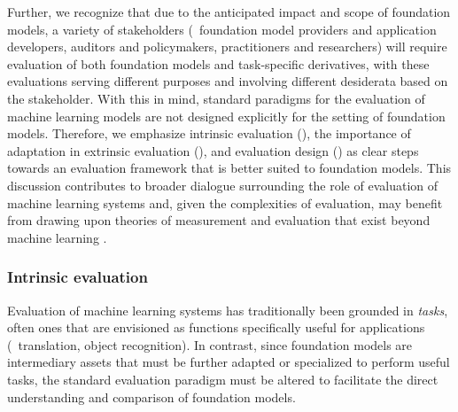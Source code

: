 Further, we recognize that due to the anticipated impact and scope of foundation models, a variety of stakeholders (\eg~foundation model providers and application developers, auditors and policymakers, practitioners and researchers) will require evaluation of both foundation models and task-specific derivatives, with these evaluations serving different purposes and involving different desiderata based on the stakeholder. 
With this in mind, standard paradigms for the evaluation of machine learning models are not designed explicitly for the setting of foundation models.
Therefore, we emphasize intrinsic evaluation (), the importance of adaptation in extrinsic evaluation (), and evaluation design () as clear steps towards an evaluation framework that is better suited to foundation models.
This discussion contributes to broader dialogue surrounding the role of evaluation of machine learning systems \citep[][\textit{inter alia}]{galliers1993, lipton2019, ribeiro2020beyond, linzen2020, kiela2021dynabench, milli2021, jacobs2021, bowman2021, dehgani2021, ma2021} and, given the complexities of evaluation, may benefit from drawing upon theories of measurement and evaluation that exist beyond machine learning \citep{messick1987, jackman2008, loevinger1957, messick1988, hand2010, brewer2014}.   

\subsubsection{Intrinsic evaluation}
\label{sec:evaluation-intrinsic}

Evaluation of machine learning systems has traditionally been grounded in \textit{tasks}, often ones that are envisioned as functions specifically useful for applications (\eg~translation, object recognition).
In contrast, since foundation models are intermediary assets that must be further adapted or specialized to perform useful tasks, the standard evaluation paradigm must be altered to facilitate the direct understanding and comparison of foundation models.

